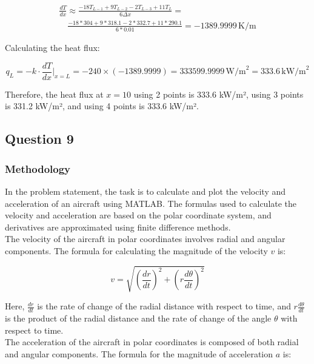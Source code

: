\documentclass[12pt, a4paper]{article}
\numberwithin{equation}{section}
\begin{document}
\begin{align}
\frac{dT}{dx} \approx \frac{-18T_{L-1} + 9T_{L-2} - 2T_{L-3} + 11T_L}{6\Delta x} = \\
\quad \frac{-18*304 + 9*318.1 - 2*332.7 + 11*290.1}{6*0.01} = -1389.9999\, \text{K/m}
\end{align}

Calculating the heat flux:

\begin{equation}
q_L = -k \cdot \frac{dT}{dx}\Bigg|_{x=L} = -240 \times (-1389.9999) = 333599.9999\, \text{W/m}^2 = 333.6\, \text{kW/m}^2
\end{equation}

Therefore, the heat flux at \(x = 10\) using 2 points is 333.6 kW/m², using 3 points is 331.2 kW/m², and using 4 points is 333.6 kW/m².


\newpage
\subsection{Question 9}

\subsubsection{Methodology}

In the problem statement, the task is to calculate and plot the velocity and acceleration of an aircraft using MATLAB. The formulas used to calculate the velocity and acceleration are based on the polar coordinate system, and derivatives are approximated using finite difference methods.
\\

The velocity of the aircraft in polar coordinates involves radial and angular components. The formula for calculating the magnitude of the velocity $v$ is:

\begin{equation}
    v = \sqrt{\left(\frac{dr}{dt}\right)^2 + \left(r \frac{d\theta}{dt}\right)^2}
\end{equation}

Here, $\frac{dr}{dt}$ is the rate of change of the radial distance with respect to time, and $r \frac{d\theta}{dt}$ is the product of the radial distance and the rate of change of the angle $\theta$ with respect to time.
\\


The acceleration of the aircraft in polar coordinates is composed of both radial and angular components. The formula for the magnitude of acceleration $a$ is:
\end{document}
